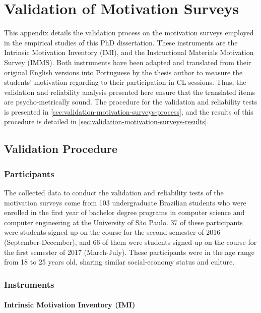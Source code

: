 \chapter{Validation of Motivation Surveys}
\label{appendix:validation-motivation-surveys}

This appendix details the validation process on the motivation surveys employed in the empirical studies of this PhD dissertation.
These instruments are the Intrinsic Motivation Inventory (IMI), and the Instructional Materials Motivation Survey (IMMS).
Both instruments have been adapted and translated from their original English versions into Portuguese by the thesis author to measure the students' motivation regarding to their participation in CL sessions.
Thus, the validation and reliability analysis presented here ensure that the translated items are psycho-metrically sound.
The procedure for the validation and reliability tests is presented in \autoref{sec:validation-motivation-surveys-process}, and the results of this procedure is detailed in \autoref{sec:validation-motivation-surveys-results}.

\section{Validation Procedure}
\label{sec:validation-motivation-surveys-process}

\subsection{Participants}

The collected data to conduct the validation and reliability tests of the motivation surveys come from 103 undergraduate Brazilian students who were enrolled in the first year of bachelor degree programs in computer science and computer engineering at the University of São Paulo. 37 of these participants were students signed up on the course  for the second semester of 2016 (September-December), and 66 of them were students signed up on the course for the first semester of 2017 (March-July). These participants were in the age range from 18 to 25 years old, sharing similar social-economy status and culture.

\subsection{Instruments}

\subsubsection*{Intrinsic Motivation Inventory (IMI)}

